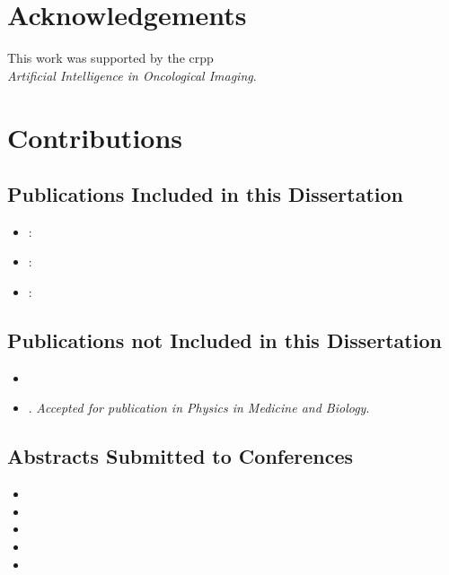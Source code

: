 \documentclass[\relativeRoot/main.tex]{subfiles}
\begin{document}


\chapter*{Acknowledgements}
\thispagestyle{empty}
This work was supported by the \gls{crpp}\\\emph{Artificial Intelligence in Oncological Imaging}.

\chapter*{Contributions}
\section*{Publications Included in this Dissertation}
\begin{itemize}
    \item {}: 
    \item {}: 
    \item {}: 
\end{itemize}

\section*{Publications not Included in this Dissertation}
\begin{itemize}
    \item {}
    \item {}. \emph{Accepted for publication in Physics in Medicine and Biology}.
\end{itemize}

\section*{Abstracts Submitted to Conferences}
\begin{itemize}
    \item {}
    \item {}
    \item {}
    \item {}
    \item {}
\end{itemize}

\tableofcontents
\thispagestyle{plain}
\end{document}
